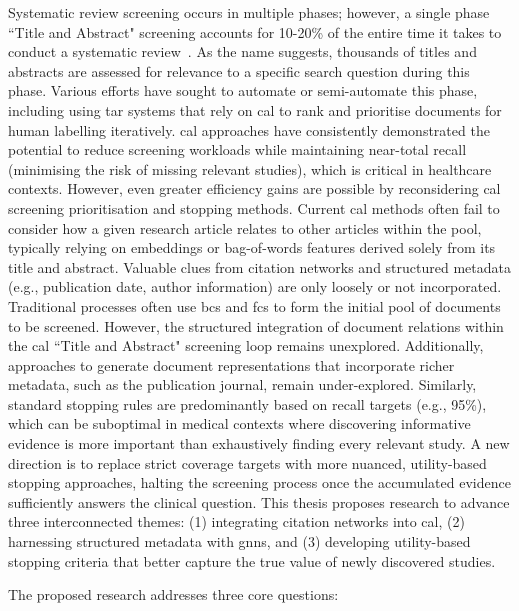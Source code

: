 \documentclass[10pt,oneside]{book}
\begin{document}
Systematic review screening occurs in multiple phases; however, a single phase ``Title and Abstract" screening accounts for 10-20\% of the entire time it takes to conduct a systematic review~\cite{haddaway_predicting_2019}. As the name suggests, thousands of titles and abstracts are assessed for relevance to a specific search question during this phase. Various efforts have sought to automate or semi-automate this phase, including using \gls*{tar} systems that rely on \gls*{cal} to rank and prioritise documents for human labelling iteratively. \gls*{cal} approaches have consistently demonstrated the potential to reduce screening workloads while maintaining near-total recall (minimising the risk of missing relevant studies), which is critical in healthcare contexts. However, even greater efficiency gains are possible by reconsidering \gls*{cal} screening prioritisation and stopping methods. Current \gls*{cal} methods often fail to consider how a given research article relates to other articles within the pool, typically relying on embeddings or bag-of-words features derived solely from its title and abstract. Valuable clues from citation networks and structured metadata (e.g., publication date, author information) are only loosely or not incorporated. Traditional processes often use \gls*{bcs} and \gls*{fcs} to form the initial pool of documents to be screened. However, the structured integration of document relations within the \gls*{cal} ``Title and Abstract" screening loop remains unexplored. Additionally, approaches to generate document representations that incorporate richer metadata, such as the publication journal, remain under-explored. Similarly, standard stopping rules are predominantly based on recall targets (e.g., 95\%), which can be suboptimal in medical contexts where discovering informative evidence is more important than exhaustively finding every relevant study. A new direction is to replace strict coverage targets with more nuanced, utility-based stopping approaches, halting the screening process once the accumulated evidence sufficiently answers the clinical question. This thesis proposes research to advance three interconnected themes: (1) integrating citation networks into \gls*{cal}, (2) harnessing structured metadata with \glspl*{gnn}, and (3) developing utility-based stopping criteria that better capture the true value of newly discovered studies.

The proposed research addresses three core questions:
\end{document}
